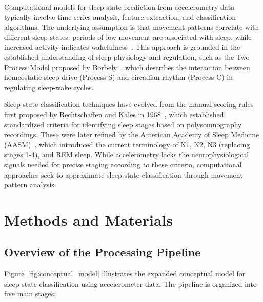 \documentclass[conference]{IEEEtran}
\begin{document}
Computational models for sleep state prediction from accelerometry data typically involve time series analysis, feature extraction, and classification algorithms. The underlying assumption is that movement patterns correlate with different sleep states: periods of low movement are associated with sleep, while increased activity indicates wakefulness~\cite{pmc4883440, researchgate2021, sadeh2011}. This approach is grounded in the established understanding of sleep physiology and regulation, such as the Two-Process Model proposed by Borbely~\cite{borbely1982}, which describes the interaction between homeostatic sleep drive (Process S) and circadian rhythm (Process C) in regulating sleep-wake cycles.

Sleep state classification techniques have evolved from the manual scoring rules first proposed by Rechtschaffen and Kales in 1968~\cite{rechtschaffen1968}, which established standardized criteria for identifying sleep stages based on polysomnography recordings. These were later refined by the American Academy of Sleep Medicine (AASM)~\cite{aasm2007}, which introduced the current terminology of N1, N2, N3 (replacing stages 1-4), and REM sleep. While accelerometry lacks the neurophysiological signals needed for precise staging according to these criteria, computational approaches seek to approximate sleep state classification through movement pattern analysis.

\section{Methods and Materials}

\subsection{Overview of the Processing Pipeline}
Figure~\ref{fig:conceptual_model} illustrates the expanded conceptual model for sleep state classification using accelerometer data. The pipeline is organized into five main stages:
\end{document}
